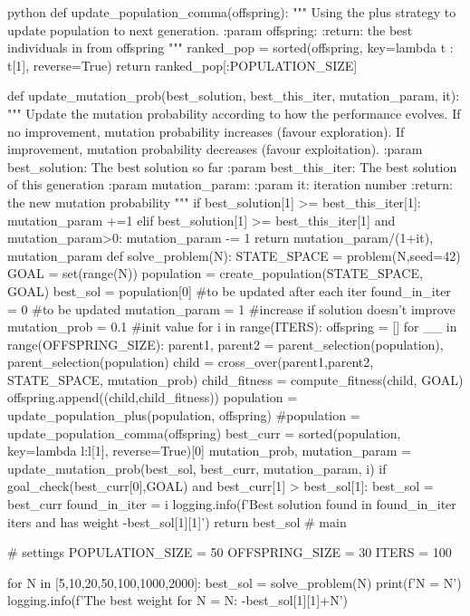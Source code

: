 \begin{mintedbox}{python}
def update_population_comma(offspring):
    """
    Using the plus strategy to update population to next generation.
    :param offspring:
    :return: the best individuals in from offspring
    """
    ranked_pop = sorted(offspring, key=lambda t : t[1], reverse=True)
    return ranked_pop[:POPULATION_SIZE]

def update_mutation_prob(best_solution, best_this_iter, mutation_param, it):
    """
    Update the mutation probability according to how the performance evolves. If no improvement, mutation probability increases (favour exploration). If improvement, mutation probability decreases (favour exploitation).
    :param best_solution: The best solution so far
    :param best_this_iter: The best solution of this generation
    :param mutation_param:
    :param it: iteration number
    :return: the new mutation probability
    """
    if best_solution[1] >= best_this_iter[1]:
        mutation_param +=1
    elif best_solution[1] >= best_this_iter[1] and mutation_param>0:
        mutation_param -= 1
    return mutation_param/(1+it), mutation_param
def solve_problem(N):
    STATE_SPACE = problem(N,seed=42)
    GOAL = set(range(N))
    population = create_population(STATE_SPACE, GOAL)
    best_sol = population[0] #to be updated after each iter
    found_in_iter = 0 #to be updated
    mutation_param = 1 #increase if solution doesn't improve
    mutation_prob = 0.1 #init value
    for i in range(ITERS):
        offspring = []
        for __ in range(OFFSPRING_SIZE):
            parent1, parent2 = parent_selection(population), parent_selection(population)
            child = cross_over(parent1,parent2, STATE_SPACE, mutation_prob)
            child_fitness = compute_fitness(child, GOAL)
            offspring.append((child,child_fitness))
        population = update_population_plus(population, offspring)
        #population = update_population_comma(offspring)
        best_curr = sorted(population, key=lambda l:l[1], reverse=True)[0]
        mutation_prob, mutation_param = update_mutation_prob(best_sol, best_curr, mutation_param, i)
        if goal_check(best_curr[0],GOAL) and best_curr[1] > best_sol[1]:
            best_sol = best_curr
            found_in_iter = i
    logging.info(f'Best solution found in {found_in_iter} iters and has weight {-best_sol[1][1]}')
    return best_sol
# main

# settings
POPULATION_SIZE = 50
OFFSPRING_SIZE = 30
ITERS = 100

for N in [5,10,20,50,100,1000,2000]:
    best_sol = solve_problem(N)
    print(f'N = {N}')
    logging.info(f'The best weight for N = {N}: {-best_sol[1][1]+N}')
\end{mintedbox}

